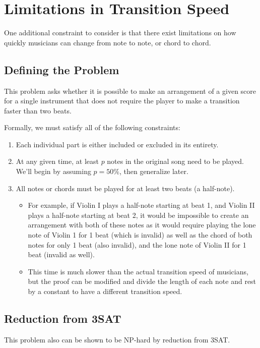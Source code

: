 \documentclass[11pt,letterpaper]{article}
\begin{document}
\section{Limitations in Transition Speed}

One additional constraint to consider is that there exist limitations on how quickly musicians can change from note to note, or chord to chord. 

\subsection{Defining the Problem}
This problem asks whether it is possible to make an arrangement of a given score for a single instrument that does not require the player to make a transition faster than two beats.

Formally, we must satisfy all of the following constraints:
\begin{enumerate}
\item Each individual part is either included or excluded in its entirety.
\item At any given time, at least $p$ notes in the original song need to be played. We'll begin by assuming $p=50\%$, then generalize later.
\item All notes or chords must be played for at least two beats (a half-note).
\begin{itemize}
\item For example, if Violin I plays a half-note starting at beat 1, and Violin II plays a half-note starting at beat 2, it would be impossible to create an arrangement with both of these notes as it would require playing the lone note of Violin 1 for 1 beat (which is invalid) as well as the chord of both notes for only 1 beat (also invalid), and the lone note of Violin II for 1 beat (invalid as well). 
\item This time is much slower than the actual transition speed of musicians, but the proof can be modified and divide the length of each note and rest by a constant to have a different transition speed.
\end{itemize}
\end{enumerate}

\subsection{Reduction from 3SAT}
This problem also can be shown to be NP-hard by reduction from 3SAT.
\end{document}
